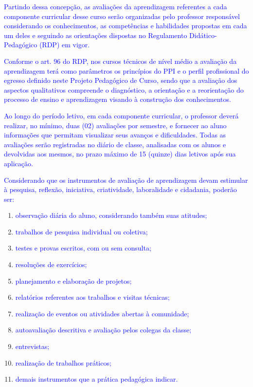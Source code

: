 \documentclass{../../modelos/latex-shared/ifsc-ppc}
\newcommand{\revisao}[1]{\textcolor{blue}{#1}}
\newcommand{\revisao}[1]{#1}
\begin{document}
\revisao{Partindo dessa concepção, as avaliações da aprendizagem referentes a cada componente curricular desse curso serão organizadas pelo professor responsável considerando os conhecimentos, as competências e habilidades propostas em cada um deles e seguindo as orientações dispostas no Regulamento Didático-Pedagógico (RDP) em vigor.}

\revisao{Conforme o art. 96 do RDP, nos cursos técnicos de nível médio a avaliação da aprendizagem terá como parâmetros os princípios do PPI e o perfil profissional do egresso definido neste Projeto Pedagógico de Curso, sendo que a avaliação dos aspectos qualitativos compreende o diagnóstico, a orientação e a reorientação do processo de ensino e aprendizagem visando à construção dos conhecimentos.}

\revisao{Ao longo do período letivo, em cada componente curricular, o professor deverá realizar, no mínimo, duas (02) avaliações por semestre, e fornecer ao aluno informações que permitam visualizar seus avanços e dificuldades. Todas as avaliações serão registradas no diário de classe, analisadas com os alunos e devolvidas aos mesmos, no prazo máximo de 15 (quinze) dias letivos após sua aplicação.}

\revisao{Considerando que os instrumentos de avaliação de aprendizagem devam estimular à pesquisa, reflexão, iniciativa, criatividade, laboralidade e cidadania, poderão ser:}
\begin{enumerate}[label=\alph*)]
    \item \revisao{observação diária do aluno, considerando também suas atitudes;}
    \item \revisao{trabalhos de pesquisa individual ou coletiva;}
    \item \revisao{testes e provas escritos, com ou sem consulta;}
    \item \revisao{resoluções de exercícios;}
    \item \revisao{planejamento e elaboração de projetos;}
    \item \revisao{relatórios referentes aos trabalhos e visitas técnicas;}
    \item \revisao{realização de eventos ou atividades abertas à comunidade;}
    \item \revisao{autoavaliação descritiva e avaliação pelos colegas da classe;}
    \item \revisao{entrevistas;}
    \item \revisao{realização de trabalhos práticos;}
    \item \revisao{demais instrumentos que a prática pedagógica indicar.}
\end{enumerate}
\end{document}
